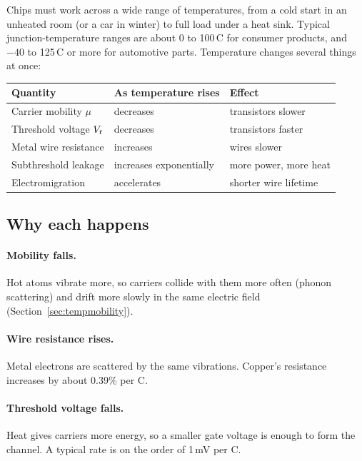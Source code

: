 Chips must work across a wide range of temperatures, from a cold start in an unheated room (or a car in winter) to full load under a heat sink. Typical junction-temperature ranges are about 0 to 100\,\textdegree C for consumer products, and $-40$ to 125\,\textdegree C or more for automotive parts. Temperature changes several things at once:

\begin{center}
\begin{tabular}{lll}
\toprule
Quantity & As temperature rises & Effect \\
\midrule
Carrier mobility $\mu$ & decreases & transistors slower \\
Threshold voltage $V_{t}$ & decreases & transistors faster \\
Metal wire resistance & increases & wires slower \\
Subthreshold leakage & increases exponentially & more power, more heat \\
Electromigration & accelerates & shorter wire lifetime \\
\bottomrule
\end{tabular}
\end{center}

\subsection*{Why each happens}

\paragraph{Mobility falls.} Hot atoms vibrate more, so carriers collide with them more often (phonon scattering) and drift more slowly in the same electric field (Section~\ref{sec:tempmobility}).

\paragraph{Wire resistance rises.} Metal electrons are scattered by the same vibrations. Copper's resistance increases by about 0.39\% per \textdegree C.

\paragraph{Threshold voltage falls.} Heat gives carriers more energy, so a smaller gate voltage is enough to form the channel. A typical rate is on the order of 1\,mV per \textdegree C.

